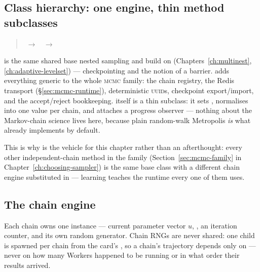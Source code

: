 \subsection{Class hierarchy: one engine, thin method subclasses}
\label{sec:toymcmc-classes}

\begin{quote}
\sffamily\footnotesize
{} $\;\to\;$  $\;\to\;$ 
\end{quote}

 is the same shared base nested sampling and
 build on (Chapters~\ref{ch:multinest},
\ref{ch:adaptive-levelset}) --- checkpointing and the notion of a barrier.
 adds everything generic to the whole \textsc{mcmc} family: the
chain registry, the Redis transport (\S\ref{sec:mcmc-runtime}), deterministic
\textsc{uuid}s, checkpoint export/import, and the accept/reject bookkeeping.
 itself is a thin subclass: it sets ,
normalises  into one value per chain, and attaches a progress
observer --- nothing about the Markov-chain science lives here, because plain
random-walk Metropolis \emph{is} what  already implements by
default.

\begin{jnote}
This is why  is the vehicle for this chapter rather than an
afterthought: every other independent-chain method in the family
(Section~\ref{sec:mcmc-family} in Chapter~\ref{ch:choosing-sampler}) is the same base
class with a different chain engine substituted in --- learning 
teaches the runtime every one of them uses.
\end{jnote}

\subsection{The chain engine}
\label{sec:toymcmc-engine}

Each chain owns one  instance --- current parameter vector $u$,
, an iteration counter, and its own  random
generator. Chain RNGs are never shared: one child  is spawned per
chain from the card's , so a chain's trajectory depends only on
 --- never on how many Workers happened to be running or in
what order their results arrived.

